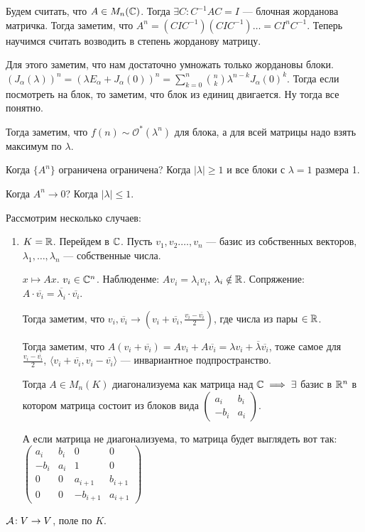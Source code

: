 Будем считать, что  $A \in M_{n}(\mathbb{C})$. Тогда  $\exists C\!: C^{-1}AC = I$ --- блочная жорданова матричка. Тогда заметим, что  $A^n = (CIC^{-1})(CIC^{-1})\ldots = CI^nC^{-1}$. Теперь научимся считать возводить в степень жорданову матрицу.

Для этого заметим, что нам достаточно умножать только жордановы блоки. $(J_\alpha(\lambda))^n = (\lambda E_{\alpha} + J_\alpha(0))^n = \sum\limits_{k=0}^n \binom{n}{k} \lambda^{n-k}J_\alpha(0)^k$. Тогда если посмотреть на блок, то заметим, что блок из единиц двигается. Ну тогда все понятно.

Тогда заметим, что $f(n) \sim \mathcal{O}^*(\lambda^n)$ для блока, а для всей матрицы надо взять максимум  по  $\lambda$.

Когда  $\{A^n\}$ ограничена ограничена? Когда  $|\lambda| \ge 1$ и все блоки с $\lambda = 1$ размера 1.

Когда  $A^n \to 0$? Когда  $|\lambda| \le 1$.

Рассмотрим несколько случаев:
\begin{enumerate}
    \item $K = \mathbb{R}$. Перейдем в  $\mathbb{C}$. Пусть  $v_1, v_2. \ldots, v_n$ --- базис из собственных векторов, $\lambda_1, \ldots, \lambda_n$ --- собственные числа.

        $x \mapsto Ax$.  $v_i \in \mathbb{C}^n$.  Наблюденме: $Av_i = \lambda_i v_i$,  $\lambda_i \notin \mathbb{R}$. Сопряжение:  $A \cdot \overline{v_i} = \overline{\lambda_i} \cdot \overline{v_i}$. 

        Тогда заметим, что $v_i, \overline{v_i} \to \left(v_i + \overline{v_i}, \frac{v_i - \overline{v_i}}{2}\right)$, где числа из пары $\in \mathbb{R}$. 

        Тогда заметим, что $A(v_i + \overline{v_i}) = Av_i + A\overline{v_i} = \lambda v_i + \overline{\lambda} \overline{v_i}$, тоже самое для  $\frac{v_i - \overline{v_i}}{2}$, $\langle v_i + \overline{v_i}, v_i - \overline{v_i} \rangle $ --- инвариантное подпространство.  

        Тогда $A \in M_n(K)$ диагонализуема как матрица над $\mathbb{C} \implies \exists$ базис в  $\mathbb{R}^n$ в котором матрица состоит из блоков вида $\begin{pmatrix} a_i & b_i \\ -b_i & a_i\end{pmatrix}$. 

        А если матрица не диагонализуема, то матрица будет выглядеть вот так:\\ $\begin{pmatrix} a_i & b_i & 0 & 0 \\ -b_i & a_i & 1 & 0 \\ 0 & 0 & a_{i+1} & b_{i+1} \\ 0 & 0 & -b_{i+1} & a_{i+1} \end{pmatrix}$
\end{enumerate}
$\mathcal{A}\!: V \to V$, поле по  $K$.

